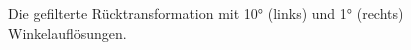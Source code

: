 \begin{figure}
\begin{minipage}{0.45\linewidth}
	\end{minipage}
	\caption{Die gefilterte Rücktransformation mit 10° (links) und 1° (rechts) Winkelauflösungen.
	\label{ct:img_resol}}
\end{figure}










